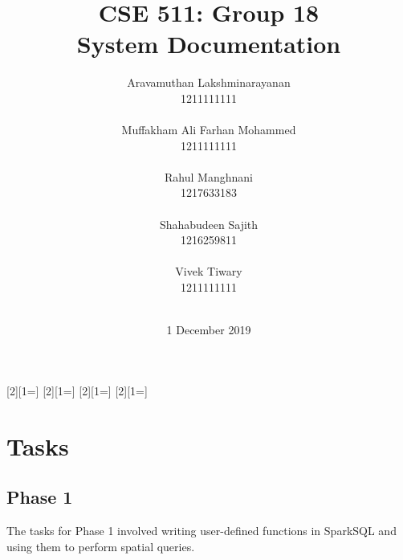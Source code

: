 \usepackage[colorinlistoftodos,prependcaption,textsize=footnotesize]{todonotes}
[2][1=]{\textcolor{Red}
{}}
[2][1=]{\textcolor{Blue}
{}}
[2][1=]{\textcolor{OliveGreen}{}}
[2][1=]{\textcolor{Plum}{}}





\title{
{\Huge CSE 511: Group 18{\large\linebreak\\} System Documentation{\large\linebreak\\}}
}
\author{
Aravamuthan Lakshminarayanan\\
1211111111\\\\
Muffakham Ali Farhan Mohammed\\
1211111111\\\\
Rahul Manghnani\\
1217633183\\\\
Shahabudeen Sajith\\
1216259811\\\\
Vivek Tiwary\\
1211111111\\\\
}
\date{1 December 2019}
\maketitle
\newpage


\tableofcontents\label{c}
\newpage

\section{Tasks} \label{Tasks}
	\subsection{Phase 1} \label{Phase 1}
    The tasks for Phase 1 involved writing user-defined functions in SparkSQL and using them to perform spatial queries.\\
    
